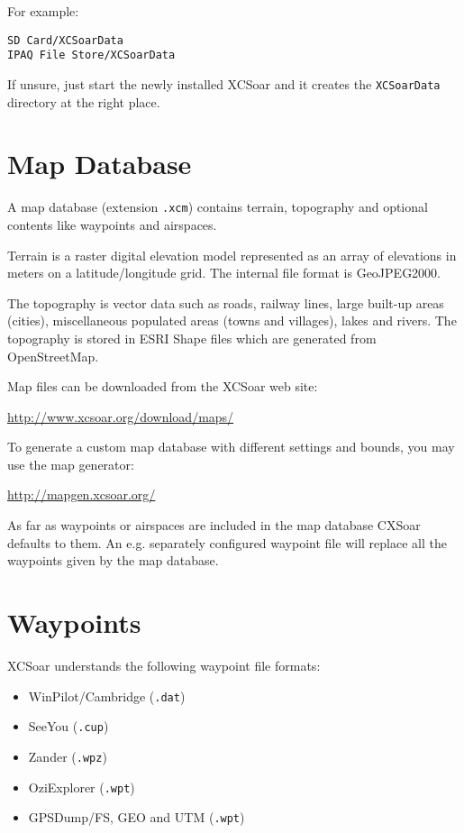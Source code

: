 For example:
\begin{verbatim}
SD Card/XCSoarData
IPAQ File Store/XCSoarData
\end{verbatim}

If unsure, just start the newly installed XCSoar and it creates the \verb|XCSoarData|
directory at the right place.

\section{Map Database}\label{sec:map}

A map database (extension \verb|.xcm|) contains terrain,
topography and optional contents like waypoints and airspaces.

Terrain is a raster digital elevation model represented as an array of
elevations in meters on a latitude/longitude grid.  The internal file
format is GeoJPEG2000.

The topography is vector data such as roads, railway lines, large
built-up areas (cities), miscellaneous populated areas (towns and
villages), lakes and rivers.  The topography is stored in ESRI Shape
files which are generated from OpenStreetMap.

Map files can be downloaded from the XCSoar web site:

\url{http://www.xcsoar.org/download/maps/}

To generate a custom map database with different settings and bounds, you
may use the map generator:

\url{http://mapgen.xcsoar.org/}

As far as waypoints or airspaces are included in the map database CXSoar 
defaults to them. An e.g. separately configured waypoint file will replace all the 
waypoints given by the map database.

\section{Waypoints}

XCSoar understands the following waypoint file formats:

\begin{itemize}
\item WinPilot/Cambridge (\verb|.dat|)
\item SeeYou (\verb|.cup|)
\item Zander (\verb|.wpz|)
\item OziExplorer (\verb|.wpt|)
\item GPSDump/FS, GEO and UTM (\verb|.wpt|)
\end{itemize}

